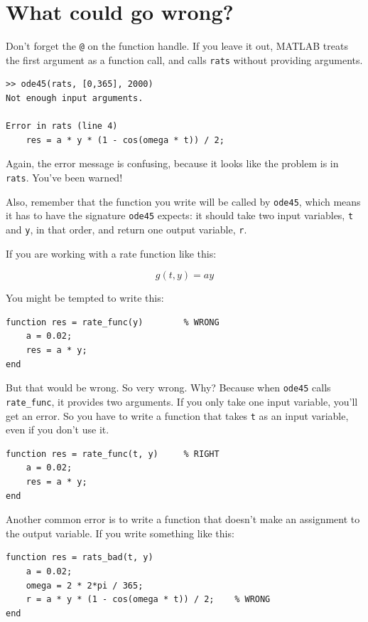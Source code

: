 \documentclass[
]{book}
\begin{document}
\section{What could go wrong?}

Don't forget the {\tt @} on the function handle.
If you leave it out, MATLAB treats the first argument as a function
call, and calls {\tt rats} without providing arguments.

\begin{verbatim}
>> ode45(rats, [0,365], 2000)
Not enough input arguments.

Error in rats (line 4)
    res = a * y * (1 - cos(omega * t)) / 2;
\end{verbatim}

Again, the error message is confusing, because it looks like the problem
is in {\tt rats}.  You've been warned!

Also, remember that the function you write will be called by
{\tt ode45}, which means it has to have the signature {\tt ode45}
expects: it should take two input variables, {\tt t} and {\tt y},
in that order, and return one output variable, {\tt r}.

If you are working with a rate function like this:

\begin{equation}
g(t, y) = a y
\end{equation}

You might be tempted to write this:

\begin{verbatim}
function res = rate_func(y)        % WRONG
    a = 0.02;
    res = a * y;
end
\end{verbatim}

But that would be wrong.  So very wrong.  Why?  Because
when {\tt ode45} calls {\tt rate\_func}, it provides two arguments.
If you only take one input variable, you'll get an error.  So
you have to write a function that takes {\tt t} as an input
variable, even if you don't use it.

\begin{verbatim}
function res = rate_func(t, y)     % RIGHT
    a = 0.02;
    res = a * y;
end
\end{verbatim}

Another common error is to write a function that doesn't make
an assignment to the output variable.  If you write something
like this:

\begin{verbatim}
function res = rats_bad(t, y)
    a = 0.02;
    omega = 2 * 2*pi / 365;
    r = a * y * (1 - cos(omega * t)) / 2;    % WRONG
end
\end{verbatim}
\end{document}
